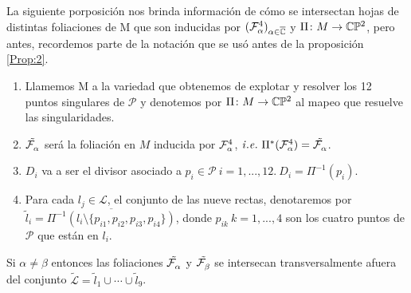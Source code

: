 
La siguiente porposición nos brinda información de cómo se intersectan hojas de distintas foliaciones de M que son inducidas por $(\Fol[4]{\alpha})_{\alpha\in\overline\C}$ y $\Pi\colon M\rightarrow\CP$, pero antes, recordemos parte de la notación que se usó antes de la proposición \ref{Prop:2}.

\begin{enumerate}


\item Llamemos M a la variedad que obtenemos de explotar y resolver los 12 puntos singulares de $\mathcal{P}$ y denotemos por $\Pi\colon M \rightarrow \CP$ al mapeo que resuelve las singularidades.

\item $\tilde{\Fol{\alpha}}$ será la foliación en $M$ inducida por $\Fol[4]{\alpha}$,  $\mathit{i.e.} \ \Pi^{*}(\Fol[4]{\alpha}) = \tilde{\Fol{\alpha}}$.

\item $D_{i}$ va a ser el divisor asociado a $p_{i} \in \mathcal{P} \ i=1,...,12. \ D_{i} = \Pi^{-1}(p_{i})$.

\item Para cada $l_{j} \in \mathcal{L}$, el conjunto de las nueve rectas,  denotaremos por $\tilde{l}_{i} = \overline{\Pi^{-1}(l_{i} \setminus \{p_{i1}, p_{i2}, p_{i3}, p_{i4} \})}$, donde $p_{ik} \ k=1,...,4$ son los cuatro puntos de $\mathcal{P}$ que están en $l_{i}$.

\end{enumerate}


\begin{Proposicion}
\label{Prop:Transversalidad}
Si $\alpha\neq\beta$ entonces las foliaciones $\tilde{\Fol{\alpha}}$ y $\tilde{\Fol{\beta}}$ se intersecan transversalmente afuera del conjunto $\tilde{\mathcal{L}} = \tilde{l}_{1}\cup\cdots\cup\tilde{l}_{9}$.
\end{Proposicion}

